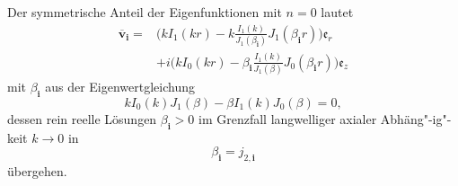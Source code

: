 \documentclass[10pt,a5paper,oneside,draft]{book}
\numberwithin{equation}{chapter}
\begin{document}
Der symmetrische Anteil der Eigenfunktionen mit $n=0$ lautet
\begin{equation}
	\begin{split}
	\mathbf{\overline{v}}_\mathbf{i} =& \bigg( kI_1(kr) - k\frac{I_1(k)}{J_1(\beta_\mathbf{i})} J_1(\beta_\mathbf{i} r)\bigg) \mathfrak{e}_r\\
		&+i\bigg( k I_0(kr) - \beta_\mathbf{i} \frac{I_1(k)}{J_1(\beta)} J_0(\beta_\mathbf{i} r)\bigg) \mathfrak{e}_z
	\end{split}	
\end{equation}
mit $\beta_\mathbf{i}$ aus der Eigenwertgleichung
\begin{equation}
	k I_0(k) J_1(\beta) - \beta I_1(k) J_0(\beta) = 0,
\end{equation}
dessen rein reelle L\"osungen $\beta_\mathbf{i} > 0$ im Grenzfall langwelliger axialer Abh\"ang"-ig"-keit $k\to0$ in
\begin{equation}
	\beta_\mathbf{i} = j_{2,\mathbf{i}}
\end{equation}
\"ubergehen.\\
\end{document}
